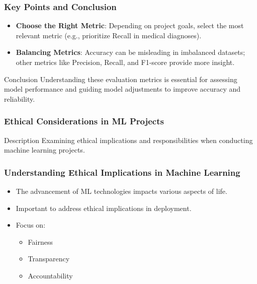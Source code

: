 \documentclass[aspectratio=169]{beamer}
\begin{document}
\begin{frame}[fragile]
    \frametitle{Key Points and Conclusion}
    \begin{itemize}
        \item \textbf{Choose the Right Metric}: Depending on project goals, select the most relevant metric (e.g., prioritize Recall in medical diagnoses).
        \item \textbf{Balancing Metrics}: 
        Accuracy can be misleading in imbalanced datasets; other metrics like Precision, Recall, and F1-score provide more insight.
    \end{itemize}
    
    \begin{block}{Conclusion}
        Understanding these evaluation metrics is essential for assessing model performance and guiding model adjustments to improve accuracy and reliability.
    \end{block}
\end{frame}

\begin{frame}[fragile]
    \frametitle{Ethical Considerations in ML Projects}
    \begin{block}{Description}
        Examining ethical implications and responsibilities when conducting machine learning projects.
    \end{block}
\end{frame}

\begin{frame}[fragile]
    \frametitle{Understanding Ethical Implications in Machine Learning}
    \begin{itemize}
        \item The advancement of ML technologies impacts various aspects of life.
        \item Important to address ethical implications in deployment.
        \item Focus on:
            \begin{itemize}
                \item Fairness
                \item Transparency
                \item Accountability
            \end{itemize}
    \end{itemize}
\end{frame}
\end{document}
